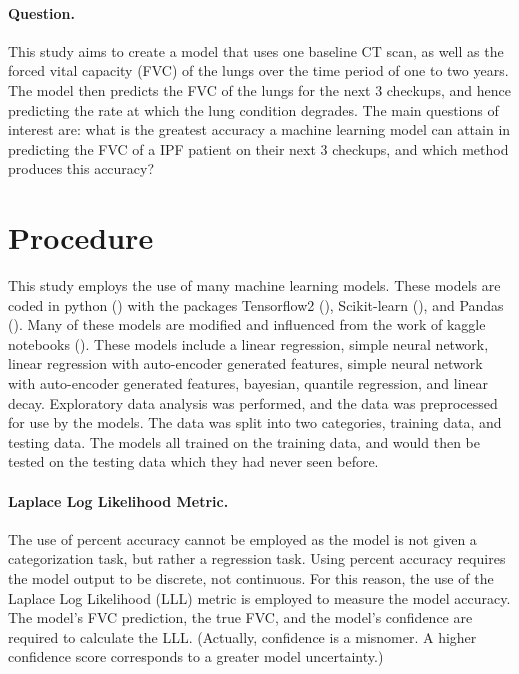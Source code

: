 \documentclass[12pt]{article}
\begin{document}
\paragraph*{Question.}

This study aims to create a model that uses one baseline CT scan, as well as the forced vital capacity (FVC) of the lungs over the time period of one to two years.
The model then predicts the FVC of the lungs for the next 3 checkups, and hence predicting the rate at which the lung condition degrades. 
The main questions of interest are: what is the greatest accuracy a machine learning model can attain in predicting the FVC of a IPF patient on their next 3 checkups, and which method produces this accuracy? 

\section{Procedure}

This study employs the use of many machine learning models.
These models are coded in python (\cite{10.5555/1593511}) with the packages Tensorflow2 (\cite{tensorflow2015-whitepaper}), Scikit-learn (\cite{scikit-learn}), and Pandas (\cite{mckinney2010data}).
Many of these models are modified and influenced from the work of kaggle notebooks (\cite{kaggle}).
These models include a linear regression, simple neural network, linear regression with auto-encoder generated features, simple neural network with auto-encoder generated features, bayesian, quantile regression, and linear decay.
Exploratory data analysis was performed, and the data was preprocessed for use by the models.
The data was split into two categories, training data, and testing data.
The models all trained on the training data, and would then be tested on the testing data which they had never seen before.

\paragraph*{Laplace Log Likelihood Metric.}

The use of percent accuracy cannot be employed as the model is not given a categorization task, but rather a regression task. 
Using percent accuracy requires the model output to be discrete, not continuous. 
For this reason, the use of the Laplace Log Likelihood (LLL) metric is employed to measure the model accuracy. 
The model's FVC prediction, the true FVC, and the model's confidence are required to calculate the LLL. 
(Actually, confidence is a misnomer. A higher confidence score corresponds to a greater model uncertainty.)
\end{document}
